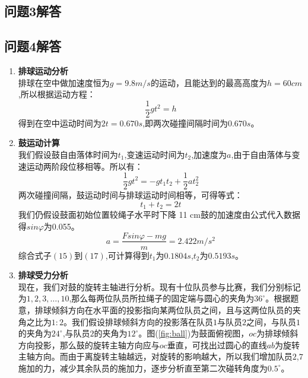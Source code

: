 \documentclass{cumcm}
\begin{document}
\subsection{问题3解答}


\subsection{问题4解答}
\begin{enumerate}
\item \textbf{排球运动分析}\\
排球在空中做加速度恒为$g=9.8m/s$的运动，且能达到的最高高度为$h=60cm$,所以根据运动方程：
\begin{displaymath}
\frac{1}{2}gt^2=h
\end{displaymath}
得到在空中运动时间为$2t=0.670s$,即两次碰撞间隔时间为$0.670s$。
\item\textbf{鼓运动计算}\\
我们假设鼓自由落体时间为$t_1$,变速运动时间为$t_2$,加速度为$a$,由于自由落体与变速运动两阶段位移相等。所以有：
\begin{equation}
\frac{1}{2}gt^2=-gt_1t_2+\frac{1}{2}at_2^2
\end{equation}
两次碰撞间隔，鼓运动时间与排球运动时间相等，可得等式：
\begin{equation}
t_1+t_2=2t
\end{equation}
我们仍假设鼓面初始位置较绳子水平时下降 11 cm鼓的加速度由公式代入数据得$sin\varphi$为0.055。
\begin{equation}
a=\frac{Fsin\varphi-mg}{m}=2.422m/s^2
\end{equation}
综合式子$(15)$到$(17)$,可计算得到$t_1$为$0.1804s$,$t_2$为$0.5193s$。
\item \textbf{排球受力分析}\\
现在，我们对鼓的旋转主轴进行分析。现有十位队员参与比赛，我们分别标记为$1,2,3,\dots,10$,那么每两位队员所拉绳子的固定端与圆心的夹角为$36^{\circ}$。根据题意，排球倾斜方向在水平面的投影指向某两位队员之间，且与这两位队员的夹角之比为$1:2$。我们假设排球倾斜方向的投影落在队员$1$与队员$2$之间，与队员$1$的夹角为$24^{\circ}$,与队员$2$的夹角为$12^{\circ}$。图(\ref{fig:ball})为鼓面俯视图，$oc$为排球倾斜方向投影，那么鼓的旋转主轴方向应与$oc$垂直，可找出过圆心的直线$ab$为旋转主轴方向。而由于离旋转主轴越远，对旋转的影响越大，所以我们增加队员$2$,$7$施加的力，减少其余队员的施加力，逐步分析直至第二次碰转角度为$0.5^{\circ}$。
\end{enumerate}
\end{document}
